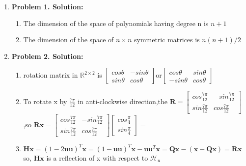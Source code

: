 \documentclass[english,onecolumn,UTF8]{IEEEtran}
\begin{document}
\begin{enumerate}
	
	\item \textbf{Problem 1. Solution:}
	\begin{enumerate}
	\item The dimension of the space of polynomials having degree n is $n+1$
	\item The dimension of the space of $n\times n$ symmetric matrices is $n(n+1)/2$
	\end{enumerate}

	\item \textbf{Problem 2. Solution:}
	\begin{enumerate}
	\item rotation matrix in $\mathbb{R}^{2\times 2}$ is $\begin{bmatrix}cos\theta & -sin\theta \\ sin\theta & cos\theta\end{bmatrix} $or$\begin{bmatrix}				cos\theta & sin\theta \\ -sin\theta & cos\theta\end{bmatrix} $


	\item To rotate x by $\frac{7\pi}{12}$ in anti-clockwise direction,the $\mathbf R=\begin{bmatrix}cos\frac{7\pi}{12} & -sin\frac{7\pi}{12} \\  					sin\frac{7\pi}{12} & cos\frac{7\pi}{12}\end{bmatrix}$,so $\mathbf{Rx}=\begin{bmatrix}cos\frac{7\pi}{12} & -sin\frac{7\pi}{12} \\ sin\frac{7\pi}				{12} & cos\frac{7\pi}{12}\end{bmatrix}\begin{bmatrix}cos\frac{\pi}{4}\\ sin\frac{\pi}{4}\end{bmatrix}=$
	


	\item $\mathbf {Hx}=(1-2\mathbf{uu})^T\mathbf x=(1-\mathbf{uu})^T\mathbf x-\mathbf{uu}^T\mathbf x =\mathbf {Qx}-(\mathbf x-\mathbf {Qx})=\mathbf{Rx}$
		\\ so, $\mathbf {Hx}$ is a reflection of x with respect to $\mathcal H_u$
     \end{enumerate}
\end{enumerate}
\end{document}
